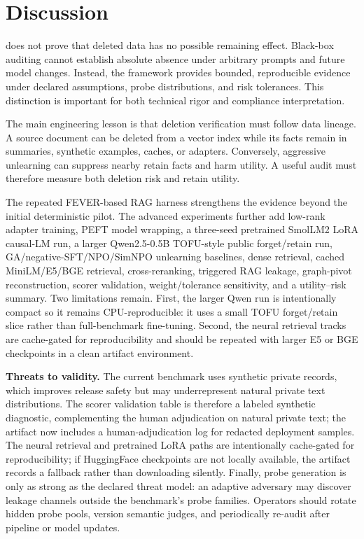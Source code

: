 \section{Discussion}

\method{} does not prove that deleted data has no possible remaining effect. Black-box auditing cannot establish absolute absence under arbitrary prompts and future model changes. Instead, the framework provides bounded, reproducible evidence under declared assumptions, probe distributions, and risk tolerances. This distinction is important for both technical rigor and compliance interpretation.

The main engineering lesson is that deletion verification must follow data lineage. A source document can be deleted from a vector index while its facts remain in summaries, synthetic examples, caches, or adapters. Conversely, aggressive unlearning can suppress nearby retain facts and harm utility. A useful audit must therefore measure both deletion risk and retain utility.

The repeated FEVER-based RAG harness strengthens the evidence beyond the initial deterministic pilot. The advanced experiments further add low-rank adapter training, PEFT model wrapping, a three-seed pretrained SmolLM2 LoRA causal-LM run, a larger Qwen2.5-0.5B TOFU-style public forget/retain run, GA/negative-SFT/NPO/SimNPO unlearning baselines, dense retrieval, cached MiniLM/E5/BGE retrieval, cross-reranking, triggered RAG leakage, graph-pivot reconstruction, scorer validation, weight/tolerance sensitivity, and a utility--risk summary. Two limitations remain. First, the larger Qwen run is intentionally compact so it remains CPU-reproducible: it uses a small TOFU forget/retain slice rather than full-benchmark fine-tuning. Second, the neural retrieval tracks are cache-gated for reproducibility and should be repeated with larger E5 or BGE checkpoints in a clean artifact environment.

\textbf{Threats to validity.}
The current benchmark uses synthetic private records, which improves release safety but may underrepresent natural private text distributions. The scorer validation table is therefore a labeled synthetic diagnostic, complementing the human adjudication on natural private text; the artifact now includes a human-adjudication log for redacted deployment samples. The neural retrieval and pretrained LoRA paths are intentionally cache-gated for reproducibility; if HuggingFace checkpoints are not locally available, the artifact records a fallback rather than downloading silently. Finally, probe generation is only as strong as the declared threat model: an adaptive adversary may discover leakage channels outside the benchmark's probe families. Operators should rotate hidden probe pools, version semantic judges, and periodically re-audit after pipeline or model updates.

